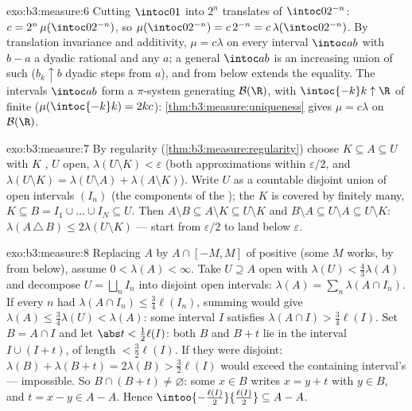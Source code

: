 \begin{solution}{exo:b3:measure:6}
Cutting $\intoc01$ into $2^n$ translates of $\intoc0{2^{-n}}$:
$c = 2^n\,\mu(\intoc0{2^{-n}})$, so $\mu(\intoc0{2^{-n}}) =
c\,2^{-n} = c\,\lambda(\intoc0{2^{-n}})$. By translation
invariance and additivity, $\mu = c\lambda$ on every interval
$\intoc ab$ with $b - a$ a dyadic rational and any $a$; a
general $\intoc ab$ is an increasing union of such
($b_k \uparrow b$ dyadic steps from $a$), and  from
below extends the equality. The intervals $\intoc ab$ form a
$\pi$-system generating $\mathcal B(\R)$, with $\intoc{-k}k
\uparrow \R$ of finite  ($\mu(\intoc{-k}k) = 2kc$):
\cref{thm:b3:measure:uniqueness} gives $\mu = c\lambda$ on
$\mathcal B(\R)$.
\end{solution}

\begin{solution}{exo:b3:measure:7}
By regularity (\cref{thm:b3:measure:regularity}) choose $K
\subseteq A \subseteq U$ with $K$ , $U$ open,
$\lambda(U\setminus K) < \varepsilon$ (both approximations
within $\varepsilon/2$, and $\lambda(U \setminus K) =
\lambda(U\setminus A) + \lambda(A \setminus K)$). Write $U$ as
a countable disjoint union of open intervals $(I_n)$ (the
components of the ); the  $K$ is covered by
finitely many, $K \subseteq B = I_1\cup\dots\cup I_N \subseteq
U$. Then $A \setminus B \subseteq A\setminus K \subseteq
U\setminus K$ and $B \setminus A \subseteq U \setminus A
\subseteq U\setminus K$:
$\lambda(A\,\triangle\,B) \leq 2\lambda(U\setminus K)$ ---
start from $\varepsilon/2$ to land below $\varepsilon$.
\end{solution}

\begin{solution}{exo:b3:measure:8}
Replacing $A$ by $A \cap [-M, M]$ of positive  (some $M$
works, by  from below), assume $0 < \lambda(A) <
\infty$. Take $U \supseteq A$ open with $\lambda(U) <
\frac43\lambda(A)$ and decompose $U = \bigsqcup_nI_n$ into
disjoint open intervals: $\lambda(A) = \sum_n\lambda(A\cap
I_n)$. If every $n$ had $\lambda(A\cap I_n) \leq
\frac34\ell(I_n)$, summing would give $\lambda(A) \leq
\frac34\lambda(U) < \lambda(A)$: some interval $I$ satisfies
$\lambda(A\cap I) > \frac34\ell(I)$. Set $B = A \cap I$ and let
$\abs t < \frac12\ell(I)$: both $B$ and $B + t$ lie in the
interval $I \cup (I + t)$, of length $< \frac32\ell(I)$. If
they were disjoint: $\lambda(B) + \lambda(B + t) = 2\lambda(B)
> \frac32\ell(I)$ would exceed the containing interval's
 --- impossible. So $B \cap (B + t) \neq \varnothing$:
some $x \in B$ writes $x = y + t$ with $y \in B$, and $t = x -
y \in A - A$.
Hence $\intoo{-\frac{\ell(I)}2}{\frac{\ell(I)}2} \subseteq A -
A$.
\end{solution}

